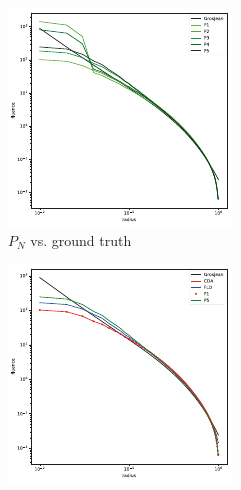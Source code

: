 \begin{figure}[h]
\centering
\begin{subfigure}{0.45\columnwidth}
\includegraphics[width=\columnwidth]{figures/pointsource_pn_small.pdf}
\caption{$P_N$ vs. ground truth}
\label{fig:pointsource_pn}
\end{subfigure}%
\hspace{0.05\columnwidth}
\begin{subfigure}{0.45\columnwidth}
\includegraphics[width=\columnwidth]{figures/pointsource_p5_small.pdf}

\end{subfigure}
\end{figure}
